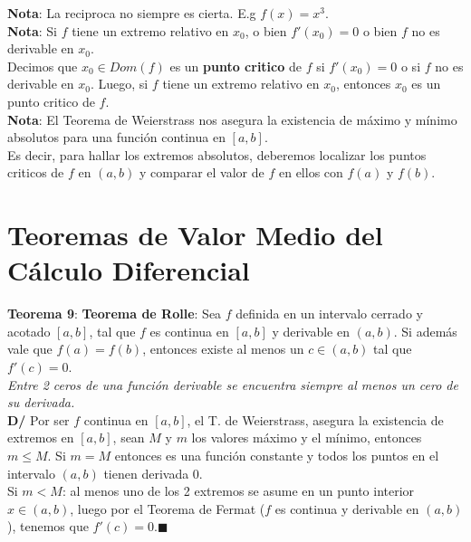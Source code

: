 \documentclass[11pt,a4paper]{article}
\newcommand*{\QEDA}{\null\nobreak\hfill\ensuremath{\blacksquare}}
\begin{document}
\noindent \textbf{Nota}: La reciproca no siempre es cierta. E.g $f(x)=x^3$.\\
\textbf{Nota}: Si $f$ tiene un extremo relativo en $x_0$, o bien $f'(x_0)=0$ o bien $f$ no es derivable en $x_0$.\\

\noindent Decimos que $x_0 \in Dom(f)$ es un \textbf{punto critico} de $f$ si $f'(x_0)=0$ o si $f$ no es derivable en $x_0$. Luego, si $f$ tiene un extremo relativo en $x_0$, entonces $x_0$ es un punto critico de $f$.\\

\noindent\textbf{Nota}: El Teorema de Weierstrass nos asegura la existencia de m\'aximo y m\'inimo absolutos para una funci\'on continua en $[a,b]$.\\

\noindent Es decir, para hallar los extremos absolutos, deberemos localizar los puntos criticos de $f$ en $(a,b)$ y comparar el valor de $f$ en ellos con $f(a)$ y $f(b)$.

\section{Teoremas de Valor Medio del C\'alculo Diferencial}
\noindent \textbf{Teorema 9}: \textbf{Teorema de Rolle}: Sea $f$ definida en un intervalo cerrado y acotado $[a,b]$, tal que $f$ es continua en $[a,b]$ y derivable en $(a,b)$. Si adem\'as vale que $f(a)=f(b)$, entonces existe al menos un $c\in(a,b)$ tal que $f'(c)=0$.\\ 
\textit{Entre 2 ceros de una funci\'on derivable se encuentra siempre al menos un cero de su derivada.}\\
\noindent\textbf{D/} Por ser $f$ continua en $[a,b]$, el T. de Weierstrass, asegura la existencia de extremos en $[a,b]$, sean $M$ y $m$ los valores m\'aximo y el m\'inimo, entonces $m \leq M$. Si $m=M$ entonces es una funci\'on constante y todos los puntos en el intervalo $(a,b)$ tienen derivada 0.\\
Si $m<M$: al menos uno de los 2 extremos se asume en un punto interior $x\in(a,b)$, luego por el Teorema de Fermat ($f$ es continua y derivable en $(a,b)$), tenemos que $f'(c)=0$.\QEDA\\

\newpage
\end{document}
